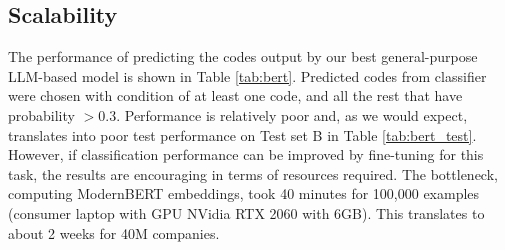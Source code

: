 \documentclass[fleqn,moreauthors,10pt]{ds_report}
\begin{document}
\subsection*{Scalability}

The performance of predicting the codes output by our best general-purpose LLM-based model is shown in Table \ref{tab:bert}. Predicted codes from classifier were chosen with condition of at least one code, and all the rest that have probability $>0.3$. Performance is relatively poor and, as we would expect, translates into poor test performance on Test set B in Table \ref{tab:bert_test}. However, if classification performance can be improved by fine-tuning for this task, the results are encouraging in terms of resources required. The bottleneck, computing ModernBERT embeddings, took 40 minutes for 100,000 examples (consumer laptop with GPU NVidia RTX 2060 with 6GB). This translates to about 2 weeks for 40M companies.

\begin{table}[htb]
\centering
{}
\caption{An evaluation of the classifiers ability to predict codes output by the best LLM.}
\label{tab:bert}
\end{table}



\begin{table}[!htb]
\centering
{}
\caption{Comparison of best LLM and classification models on Test set B.}
\label{tab:bert_test}
\end{table}
\end{document}
